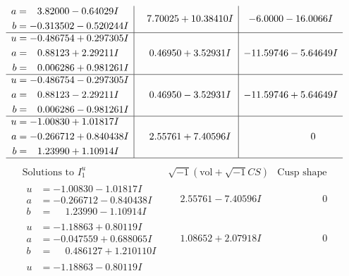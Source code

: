 \documentclass[1p]{elsarticle_modified}
\theoremstyle{definition}
\newcommand{\I}{\sqrt{-1}}
\begin{document}
$$\begin{array}{c|c|c}
\begin{aligned}
a &= \phantom{-}3.82000 - 0.64029 I \\
b &= -0.313502 - 0.520244 I\end{aligned}
 & \phantom{-}7.70025 + 10.38410 I & -6.0000 - 16.0066 I \\ \hline\begin{aligned}
u &= -0.486754 + 0.297305 I \\
a &= \phantom{-}0.88123 + 2.29211 I \\
b &= \phantom{-}0.006286 + 0.981261 I\end{aligned}
 & \phantom{-}0.46950 + 3.52931 I & -11.59746 - 5.64649 I \\ \hline\begin{aligned}
u &= -0.486754 - 0.297305 I \\
a &= \phantom{-}0.88123 - 2.29211 I \\
b &= \phantom{-}0.006286 - 0.981261 I\end{aligned}
 & \phantom{-}0.46950 - 3.52931 I & -11.59746 + 5.64649 I \\ \hline\begin{aligned}
u &= -1.00830 + 1.01817 I \\
a &= -0.266712 + 0.840438 I \\
b &= \phantom{-}1.23990 + 1.10914 I\end{aligned}
 & \phantom{-}2.55761 + 7.40596 I & \phantom{-0.000000 } 0\\
 \hline 
 \end{array}$$\newpage$$\begin{array}{c|c|c}  
\text{Solutions to }I^u_{1}& \I (\text{vol} + \sqrt{-1}CS) & \text{Cusp shape}\\
 \hline 
\begin{aligned}
u &= -1.00830 - 1.01817 I \\
a &= -0.266712 - 0.840438 I \\
b &= \phantom{-}1.23990 - 1.10914 I\end{aligned}
 & \phantom{-}2.55761 - 7.40596 I & \phantom{-0.000000 } 0 \\ \hline\begin{aligned}
u &= -1.18863 + 0.80119 I \\
a &= -0.047559 + 0.688065 I \\
b &= \phantom{-}0.486127 + 1.210110 I\end{aligned}
 & \phantom{-}1.08652 + 2.07918 I & \phantom{-0.000000 } 0 \\ \hline\begin{aligned}
u &= -1.18863 - 0.80119 I \\

\end{aligned}
\end{array}$$
\end{document}
